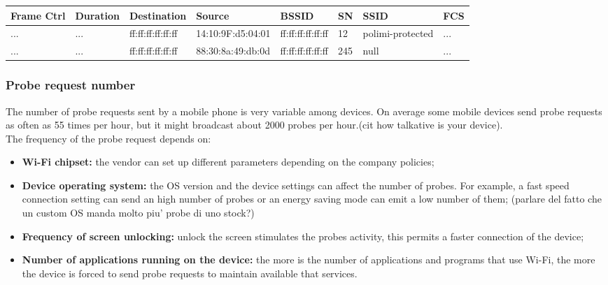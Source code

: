 \begin{tabularx}{\textwidth}{|l|l|l|l|l|l|l|l|}
\hline
 Frame Ctrl & Duration & Destination &Source & BSSID & SN & SSID& FCS \\ \hline
... & ... & ff:ff:ff:ff:ff:ff  & 14:10:9F:d5:04:01 & ff:ff:ff:ff:ff:ff& 12 & polimi-protected & ... \\
... & ... & ff:ff:ff:ff:ff:ff  & 88:30:8a:49:db:0d & ff:ff:ff:ff:ff:ff& 245 & null & ... \\ \hline
\end{tabularx}

\subsubsection{Probe request number}
The number of probe requests sent by a mobile phone is very variable among devices. On average some mobile devices send probe requests as often as 55 times per hour, but it might broadcast about 2000 probes per hour.(cit how talkative is your device).\\
The frequency of the probe request depends on:
\begin{itemize}
\item \textbf{Wi-Fi chipset:} the vendor can set up different parameters depending on the company policies;
\item \textbf{Device operating system:} the OS version and the device settings can affect the number of probes. For example, a fast speed connection setting can send an high number of probes or an energy saving mode can emit a low number of them; (parlare del fatto che un custom OS manda molto piu' probe di uno stock?)
\item \textbf{Frequency of screen unlocking:} unlock the screen stimulates the probes activity, this permits a faster connection of the device;
\item \textbf{Number of applications running on the device:} the more is the number of applications and programs that use Wi-Fi, the more the device is forced to send probe requests to maintain available that services.
\end{itemize}

